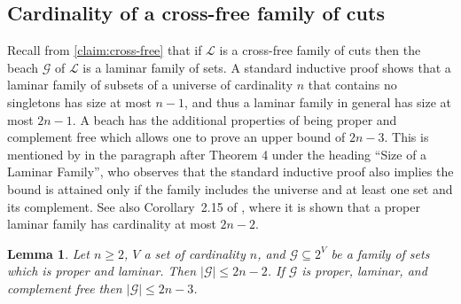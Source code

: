 \documentclass[10pt,a4paper]{article}
\newcommand{\Lcal}{\mathcal{L}}
\newcommand{\Gcal}{\mathcal{G}}
\newcommand{\1}{\mathbf{1}}
\newtheorem{lemma}[theorem]{Lemma}
\theoremstyle{definition}
\begin{document}
\subsection{Cardinality of a cross-free family of cuts}
\label{sec:card}
Recall from \cref{claim:cross-free} that if $\Lcal$ is a cross-free family of cuts then the beach $\Gcal$ of $\Lcal$ is a laminar family of sets.
A standard inductive proof shows that a laminar family of subsets of a universe of cardinality $n$ that contains no singletons has size at most $n-1$, and thus a laminar
family in general has size at most $2n-1$.  A beach has the additional properties of being proper and complement free
which allows one to prove an upper bound of $2n-3$.  This is mentioned by \cite{Goemans06} in the paragraph after Theorem 4
under the heading ``Size of a Laminar Family'', who observes that the standard inductive proof also
implies the bound is attained only if the family includes the universe and at least one set and its complement.
See also Corollary~2.15 of \cite{KV18}, where it is shown that a proper laminar family has cardinality at most $2n-2$.

\begin{lemma}
\label{lem:laminar_size}
Let $n \ge 2$, $V$ a set of cardinality $n$, and $\Gcal \subseteq 2^{V}$ be a family of sets which is proper and laminar.  Then
$|\Gcal| \le 2n-2$.  If $\Gcal$ is proper, laminar, and complement free then $|\Gcal| \le 2n-3$.
\end{lemma}
\end{document}
